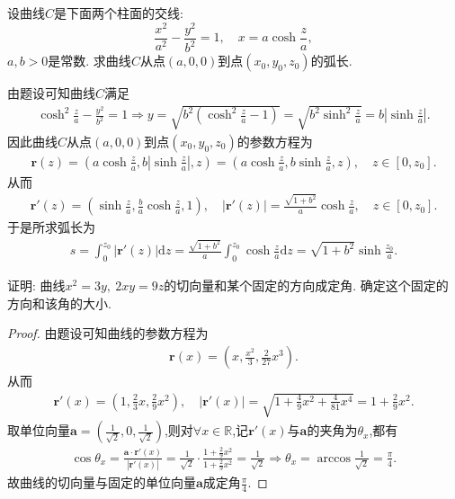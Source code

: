 \documentclass[../../main.tex]{subfiles}%
\begin{document}
\begin{example}
设曲线$C$是下面两个柱面的交线:
\[
\frac{x^2}{a^2} - \frac{y^2}{b^2} = 1,\quad x = a \cosh \frac{z}{a},
\]
$a,b>0$是常数. 求曲线$C$从点$(a,0,0)$到点$(x_0, y_0, z_0)$的弧长.
\end{example}
\begin{solution}

由题设可知曲线$C$满足
\begin{align*}
\cosh^2\frac{z}{a}-\frac{y^2}{b^2}=1\Longrightarrow y=\sqrt{b^2\left( \cosh^2\frac{z}{a}-1 \right)}=\sqrt{b^2\sinh^2\frac{z}{a}}=b\left| \sinh\frac{z}{a} \right|.
\end{align*}
因此曲线$C$从点$(a,0,0)$到点$(x_0,y_0,z_0)$的参数方程为
\begin{align*}
\bm{r}(z)=\left( a\cosh\frac{z}{a},b\left| \sinh\frac{z}{a} \right|,z \right)=\left( a\cosh\frac{z}{a},b\sinh\frac{z}{a},z \right),\quad z\in [0,z_0].
\end{align*}
从而
\begin{align*}
\bm{r}'(z)=\left( \sinh\frac{z}{a},\frac{b}{a}\cosh\frac{z}{a},1 \right),\quad |\bm{r}'(z)|=\frac{\sqrt{1+b^2}}{a}\cosh\frac{z}{a},\quad z\in [0,z_0].
\end{align*}
于是所求弧长为
\begin{align*}
s=\int_0^{z_0} |\bm{r}'(z)|\mathrm{d}z=\frac{\sqrt{1+b^2}}{a}\int_0^{z_0} \cosh\frac{z}{a}\mathrm{d}z=\sqrt{1+b^2}\sinh\frac{z_0}{a}.
\end{align*}

\end{solution}

\begin{example}
证明: 曲线$x^2 = 3y,\ 2xy = 9z$的切向量和某个固定的方向成定角. 确定这个固定的方向和该角的大小.
\end{example}
\begin{proof}

由题设可知曲线的参数方程为
\begin{align*}
\bm{r}(x)=\left(x,\frac{x^2}{3},\frac{2}{27}x^3\right).
\end{align*}
从而
\begin{align*}
\bm{r}'(x)=\left(1,\frac{2}{3}x,\frac{2}{9}x^2\right),\quad |\bm{r}'(x)|=\sqrt{1+\frac{4}{9}x^2+\frac{4}{81}x^4}=1+\frac{2}{9}x^2.
\end{align*}
取单位向量$\bm{a}=\left(\frac{1}{\sqrt{2}},0,\frac{1}{\sqrt{2}}\right)$,则对$\forall x\in \mathbb{R}$,记$\bm{r}'(x)$与$\bm{a}$的夹角为$\theta_x$,都有
\begin{align*}
\cos \theta _x=\frac{\boldsymbol{a}\cdot \boldsymbol{r}' (x)}{|\boldsymbol{r}' (x)|}=\frac{1}{\sqrt{2}}\cdot \frac{1+\frac{2}{9}x^2}{1+\frac{2}{9}x^2}=\frac{1}{\sqrt{2}}\Longrightarrow \theta _x=\arccos \frac{1}{\sqrt{2}}=\frac{\pi}{4}.
\end{align*}
故曲线的切向量与固定的单位向量$\bm{a}$成定角$\frac{\pi}{4}$.

\end{proof}
\end{document}
